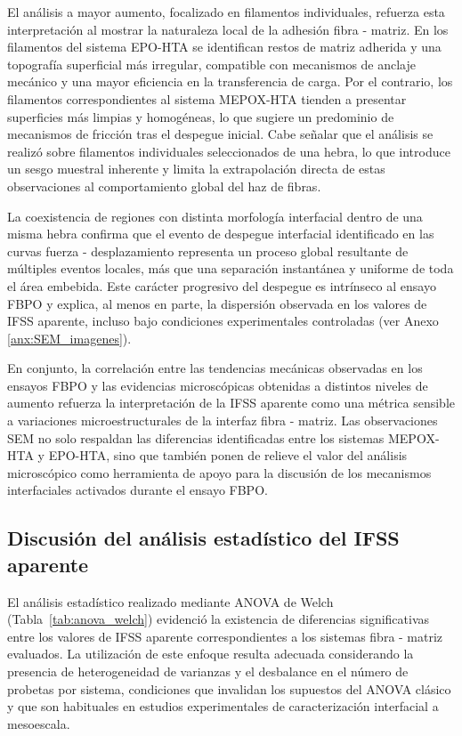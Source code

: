 El análisis a mayor aumento, focalizado en filamentos individuales, refuerza esta interpretación
al mostrar la naturaleza local de la adhesión fibra - matriz. En los filamentos del
sistema EPO-HTA se identifican restos de matriz adherida y una topografía superficial más
irregular, compatible con mecanismos de anclaje mecánico y una mayor eficiencia en la
transferencia de carga. Por el contrario, los filamentos correspondientes al sistema MEPOX-HTA
tienden a presentar superficies más limpias y homogéneas, lo que sugiere un predominio de mecanismos
de fricción tras el despegue inicial. Cabe señalar que el análisis se realizó sobre filamentos
individuales seleccionados de una hebra, lo que introduce un sesgo muestral inherente y limita
la extrapolación directa de estas observaciones al comportamiento global del haz de fibras.

La coexistencia de regiones con distinta morfología interfacial dentro de una misma hebra
confirma que el evento de despegue interfacial identificado en las curvas fuerza - desplazamiento
representa un proceso global resultante de múltiples eventos locales, más que una separación
instantánea y uniforme de toda el área embebida. Este carácter progresivo del despegue es
intrínseco al ensayo FBPO y explica, al menos en parte, la dispersión observada en los valores de
IFSS aparente, incluso bajo condiciones experimentales controladas (ver Anexo \ref{anx:SEM_imagenes}).

En conjunto, la correlación entre las tendencias mecánicas observadas en los ensayos FBPO y las
evidencias microscópicas obtenidas a distintos niveles de aumento refuerza la interpretación de
la IFSS aparente como una métrica sensible a variaciones microestructurales de la interfaz
fibra - matriz. Las observaciones SEM no solo respaldan las diferencias identificadas entre los
sistemas MEPOX-HTA y EPO-HTA, sino que también ponen de relieve el valor del análisis
microscópico como herramienta de apoyo para la discusión de los mecanismos interfaciales
activados durante el ensayo FBPO.

\subsection{Discusión del análisis estadístico del IFSS aparente}

El análisis estadístico realizado mediante ANOVA de Welch
(Tabla~\ref{tab:anova_welch}) evidenció la existencia de diferencias significativas entre los
valores de IFSS aparente correspondientes a los sistemas fibra - matriz evaluados. La utilización
de este enfoque resulta adecuada considerando la presencia de heterogeneidad de varianzas y el
desbalance en el número de probetas por sistema, condiciones que invalidan los supuestos del
ANOVA clásico y que son habituales en estudios experimentales de caracterización interfacial a
mesoescala.

